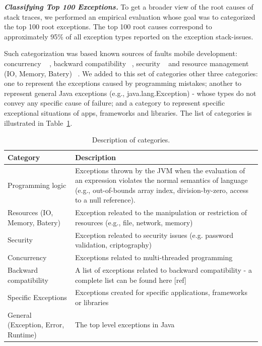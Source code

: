 \documentclass[conference]{IEEEtran}
\begin{document}
\emph{\textbf{Classifying Top 100 Exceptions.}} To get a broader view of the root causes of stack traces,
 we performed an empirical evaluation
whose goal was to categorized the top 100 root exceptions. The top 100 root causes correspond 
to approximately 95\% of all exception types reported on the exception stack-issues. 

Such categorization was based known sources of faults mobile development: concurrency ~\cite{ama2012}
, backward compatibility  ~\cite{McDon13}, security   ~\cite{enck2011study} and resource management (IO, Memory, Batery) ~\cite{Zhang12}.
We added to this set of categories other three categories: one to represent the exceptions caused by programming mistakes;
  another to represent general Java exceptions (e.g., java.lang.Exception) - whose types do not convey any specific cause of failure; and a category to
represent specific  exceptional situations of apps, frameworks and libraries.
The list of categories is illustrated in Table~\ref{tab:categories}. 

\begin{table}
  \centering
  \begin{tabular}{|p{2cm}| p{5cm}|}
    \hline
    \bfseries{Category} & \bfseries{Description} \\
    \hline
      Programming logic &  Exceptions thrown by the JVM when the 
evaluation of an expression violates the normal semantics of language (e.g., 
out-of-bounds array index, division-by-zero, access to a null reference). \\ \hline
      Resources (IO, Memory, Batery)  & Exception releated to the manipulation or restriction of resources (e.g., file, network, memory) \\ \hline
      Security                               & Exception releated to security issues (e.g. password validation, criptography) \\ \hline
      Concurrency                            & Exceptions related to multi-threaded programming \\ \hline
      Backward compatibility                 &  A list of exceptions related to backward compatibility - a complete list can be found here [ref]  \\ \hline
      Specific Exceptions              & Exceptions created for specific applications, frameworks or libraries \\ \hline
      General (Exception, Error, Runtime)    & The top level exceptions in Java    \\ \hline
    \hline
  \end{tabular}
  \caption{Description of categories.}
  \label{tab:categories}
\end{table}
\end{document}
